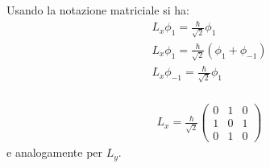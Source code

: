 Usando la notazione matriciale si ha:
\begin{equation}\begin{split}
L_x\phi_1=\frac{\hbar }{\sqrt{2}}\phi_1\\
L_x\phi_1=\frac{\hbar }{\sqrt{2}}\left(\phi_1+\phi_{-1}\right)\\
L_x\phi_{-1}=\frac{\hbar }{\sqrt{2}}\phi_1\\
\end{split}\end{equation}

\begin{equation}\begin{split}
L_x=\frac{\hbar }{\sqrt{2}}\left(\begin{matrix}0&1&0\\1&0&1\\0&1&0\end{matrix}\right)
\end{split}\end{equation}
e analogamente per $L_y$.

